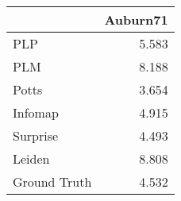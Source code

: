 \begin{tabular}{lr}
\toprule
{} & Auburn71 \\
\midrule
PLP          &    5.583 \\
PLM          &    8.188 \\
Potts        &    3.654 \\
Infomap      &    4.915 \\
Surprise     &    4.493 \\
Leiden       &    8.808 \\
Ground Truth &    4.532 \\
\bottomrule
\end{tabular}
